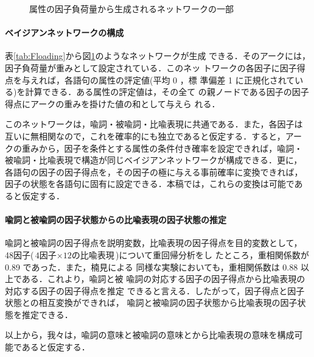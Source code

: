 \begin{figure}[htbp]
 \vspace{-1mm}
  \begin{center}
    \leavevmode
      \vspace{-1.5mm}
  \end{center}
  \caption{属性の因子負荷量から生成されるネットワークの一部}
    \vspace{-1mm}
  \label{fig:Floading}
\end{figure}

\paragraph{ベイジアンネットワークの構成}

表\ref{tab:Floading}から図\ref{fig:Floading}のようなネットワークが生成
できる．そのアークには，因子負荷量が重みとして設定されている．このネッ
トワークの各因子に因子得点を与えれば，各語句の属性の評定値(平均 0 ，標
準偏差 1 に正規化されている)を計算できる．ある属性の評定値は，その全て
の親ノードである因子の因子得点にアークの重みを掛けた値の和として与えら
れる．

このネットワークは，喩詞・被喩詞・比喩表現に共通である．また，各因子は
互いに無相関なので，これを確率的にも独立であると仮定する．すると，アー
クの重みから，因子を条件とする属性の条件付き確率を設定できれば，喩詞・
被喩詞・比喩表現で構造が同じベイジアンネットワークが構成できる．更に，
各語句の因子の因子得点を，その因子の極に与える事前確率に変換できれば，
因子の状態を各語句に固有に設定できる．本稿では，これらの変換は可能であ
ると仮定する．

\vspace{-0.4mm}
\paragraph{喩詞と被喩詞の因子状態からの比喩表現の因子状態の推定}
喩詞と被喩詞の因子得点を説明変数，比喩表現の因子得点を目的変数として，
48因子($\mbox{4因子}\times\mbox{12の比喩表現} $)について重回帰分析をし
たところ，重相関係数が 0.89 であった．また，楠見\cite{Kusumi93}による
同様な実験においても，重相関係数は 0.88 以上である．これより，喩詞と被
喩詞の対応する因子の因子得点から比喩表現の対応する因子の因子得点を推定
できると言える．したがって，因子得点と因子状態との相互変換ができれば，
喩詞と被喩詞の因子状態から比喩表現の因子状態を推定できる．

以上から，我々は，喩詞の意味と被喩詞の意味とから比喩表現の意味を構成可
能であると仮定する．

